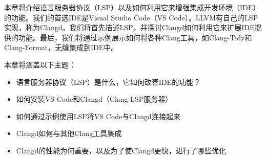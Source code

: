 本章将介绍语言服务器协议（LSP）以及如何利用它来增强集成开发环境（IDE）的功能。我们的首选IDE是Visual Studio Code（VS Code）。LLVM有自己的LSP实现，称为Clangd。我们将首先描述LSP，并探讨Clangd如何利用它来扩展IDE提供的功能。最后，我们将通过示例展示如何将各种Clang工具，如Clang-Tidy和Clang-Format，无缝集成到IDE中。

本章将涵盖以下主题：

\begin{itemize}
\item
语言服务器协议（LSP）是什么，它如何改善IDE的功能？

\item
如何安装VS Code和Clangd（Clang LSP服务器）

\item
如何通过示例使用LSP将VS Code与Clangd连接起来

\item
Clangd如何与其他Clang工具集成

\item
Clangd的性能为何重要，以及为了使Clangd更快，进行了哪些优化
\end{itemize}
